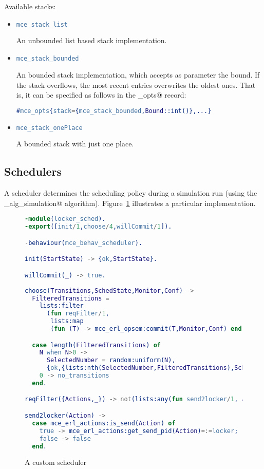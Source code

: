\documentclass[a4paper]{article}
\begin{document}
Available stacks:
\begin{itemize}
\item
\begin{lstlisting}[language=Erlang]
mce_stack_list
\end{lstlisting}
An unbounded list based stack implementation.

\item
\begin{lstlisting}[language=Erlang]
mce_stack_bounded
\end{lstlisting}
An bounded stack implementation, which accepts as parameter
the bound. If the stack overflows, the most recent entries overwrites
the oldest ones.
That is, it can be specified as follows in the
\lstinline@mce_opts@ record:
\begin{lstlisting}[language=Erlang]
#mce_opts{stack={mce_stack_bounded,Bound::int()},...}
\end{lstlisting}

\item
\begin{lstlisting}[language=Erlang]
mce_stack_onePlace
\end{lstlisting}
A bounded stack with just one place.
\end{itemize}

\subsection{Schedulers}
\label{schedulers}
A scheduler determines the scheduling policy during a simulation
run (using the \lstinline@mce_alg_simulation@ algorithm).
Figure~\ref{locker_sched} illustrates a particular implementation.

\begin{figure}
\begin{lstlisting}[language=Erlang]
-module(locker_sched).
-export([init/1,choose/4,willCommit/1]).

-behaviour(mce_behav_scheduler).

init(StartState) -> {ok,StartState}.

willCommit(_) -> true.
  
choose(Transitions,SchedState,Monitor,Conf) ->
  FilteredTransitions =
    lists:filter
      (fun reqFilter/1,
       lists:map
       (fun (T) -> mce_erl_opsem:commit(T,Monitor,Conf) end, Transitions)),

  case length(FilteredTransitions) of
    N when N>0 ->
      SelectedNumber = random:uniform(N),
      {ok,{lists:nth(SelectedNumber,FilteredTransitions),SchedState}};
    0 -> no_transitions
  end.

reqFilter({Actions,_}) -> not(lists:any(fun send2locker/1, Actions)).

send2locker(Action) ->
  case mce_erl_actions:is_send(Action) of
    true -> mce_erl_actions:get_send_pid(Action)=:=locker;
    false -> false
  end.
\end{lstlisting}
\caption{A custom scheduler}
\label{locker_sched}
\end{figure}
\end{document}
